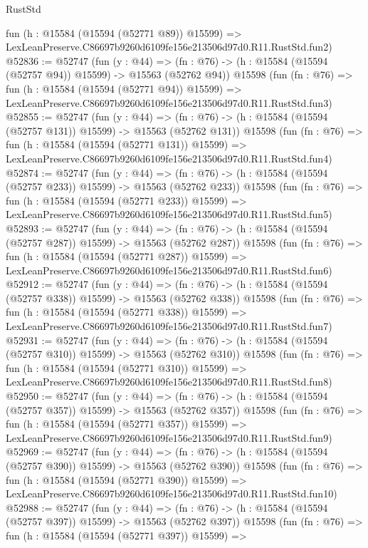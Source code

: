 \begin{lexlean}{RustStd}
\begin{coremodule}
    fun (h : @15584 (@15594 (@52771 @89)) @15599) =>
    LexLeanPreserve.C86697b9260d6109fe156e213506d97d0.R11.RustStd.fun2)
@52836 := @52747
    (fun (y : @44) =>
    (fn : @76) -> (h : @15584 (@15594 (@52757 @94)) @15599) -> @15563 (@52762 @94))
    @15598
    (fun (fn : @76) =>
    fun (h : @15584 (@15594 (@52771 @94)) @15599) =>
    LexLeanPreserve.C86697b9260d6109fe156e213506d97d0.R11.RustStd.fun3)
@52855 := @52747
    (fun (y : @44) =>
    (fn : @76) -> (h : @15584 (@15594 (@52757 @131)) @15599) -> @15563 (@52762 @131))
    @15598
    (fun (fn : @76) =>
    fun (h : @15584 (@15594 (@52771 @131)) @15599) =>
    LexLeanPreserve.C86697b9260d6109fe156e213506d97d0.R11.RustStd.fun4)
@52874 := @52747
    (fun (y : @44) =>
    (fn : @76) -> (h : @15584 (@15594 (@52757 @233)) @15599) -> @15563 (@52762 @233))
    @15598
    (fun (fn : @76) =>
    fun (h : @15584 (@15594 (@52771 @233)) @15599) =>
    LexLeanPreserve.C86697b9260d6109fe156e213506d97d0.R11.RustStd.fun5)
@52893 := @52747
    (fun (y : @44) =>
    (fn : @76) -> (h : @15584 (@15594 (@52757 @287)) @15599) -> @15563 (@52762 @287))
    @15598
    (fun (fn : @76) =>
    fun (h : @15584 (@15594 (@52771 @287)) @15599) =>
    LexLeanPreserve.C86697b9260d6109fe156e213506d97d0.R11.RustStd.fun6)
@52912 := @52747
    (fun (y : @44) =>
    (fn : @76) -> (h : @15584 (@15594 (@52757 @338)) @15599) -> @15563 (@52762 @338))
    @15598
    (fun (fn : @76) =>
    fun (h : @15584 (@15594 (@52771 @338)) @15599) =>
    LexLeanPreserve.C86697b9260d6109fe156e213506d97d0.R11.RustStd.fun7)
@52931 := @52747
    (fun (y : @44) =>
    (fn : @76) -> (h : @15584 (@15594 (@52757 @310)) @15599) -> @15563 (@52762 @310))
    @15598
    (fun (fn : @76) =>
    fun (h : @15584 (@15594 (@52771 @310)) @15599) =>
    LexLeanPreserve.C86697b9260d6109fe156e213506d97d0.R11.RustStd.fun8)
@52950 := @52747
    (fun (y : @44) =>
    (fn : @76) -> (h : @15584 (@15594 (@52757 @357)) @15599) -> @15563 (@52762 @357))
    @15598
    (fun (fn : @76) =>
    fun (h : @15584 (@15594 (@52771 @357)) @15599) =>
    LexLeanPreserve.C86697b9260d6109fe156e213506d97d0.R11.RustStd.fun9)
@52969 := @52747
    (fun (y : @44) =>
    (fn : @76) -> (h : @15584 (@15594 (@52757 @390)) @15599) -> @15563 (@52762 @390))
    @15598
    (fun (fn : @76) =>
    fun (h : @15584 (@15594 (@52771 @390)) @15599) =>
    LexLeanPreserve.C86697b9260d6109fe156e213506d97d0.R11.RustStd.fun10)
@52988 := @52747
    (fun (y : @44) =>
    (fn : @76) -> (h : @15584 (@15594 (@52757 @397)) @15599) -> @15563 (@52762 @397))
    @15598
    (fun (fn : @76) =>
    fun (h : @15584 (@15594 (@52771 @397)) @15599) =>

\end{coremodule}
\end{lexlean}
